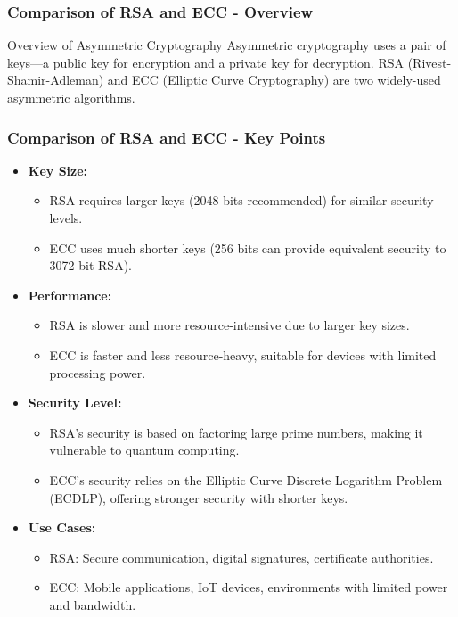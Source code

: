 \documentclass{beamer}
\begin{document}
\begin{frame}[fragile]
    \frametitle{Comparison of RSA and ECC - Overview}
    \begin{block}{Overview of Asymmetric Cryptography}
        Asymmetric cryptography uses a pair of keys—a public key for encryption and a private key for decryption. RSA (Rivest-Shamir-Adleman) and ECC (Elliptic Curve Cryptography) are two widely-used asymmetric algorithms.
    \end{block}
\end{frame}

\begin{frame}[fragile]
    \frametitle{Comparison of RSA and ECC - Key Points}
    \begin{itemize}
        \item \textbf{Key Size:}
        \begin{itemize}
            \item RSA requires larger keys (2048 bits recommended) for similar security levels.
            \item ECC uses much shorter keys (256 bits can provide equivalent security to 3072-bit RSA).
        \end{itemize}
        
        \item \textbf{Performance:}
        \begin{itemize}
            \item RSA is slower and more resource-intensive due to larger key sizes.
            \item ECC is faster and less resource-heavy, suitable for devices with limited processing power.
        \end{itemize}
        
        \item \textbf{Security Level:}
        \begin{itemize}
            \item RSA's security is based on factoring large prime numbers, making it vulnerable to quantum computing.
            \item ECC's security relies on the Elliptic Curve Discrete Logarithm Problem (ECDLP), offering stronger security with shorter keys.
        \end{itemize}
        
        \item \textbf{Use Cases:}
        \begin{itemize}
            \item RSA: Secure communication, digital signatures, certificate authorities.
            \item ECC: Mobile applications, IoT devices, environments with limited power and bandwidth.
        \end{itemize}
    \end{itemize}
\end{frame}
\end{document}
